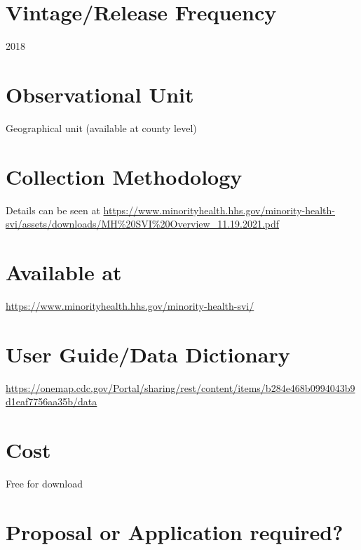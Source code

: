 \documentclass[
]{book}
\begin{document}
\hypertarget{vintagerelease-frequency-40}{%
\section{Vintage/Release Frequency}\label{vintagerelease-frequency-40}}

2018

\hypertarget{observational-unit-40}{%
\section{Observational Unit}\label{observational-unit-40}}

Geographical unit (available at county level)

\hypertarget{collection-methodology-40}{%
\section{Collection Methodology}\label{collection-methodology-40}}

Details can be seen at \url{https://www.minorityhealth.hhs.gov/minority-health-svi/assets/downloads/MH\%20SVI\%20Overview_11.19.2021.pdf}

\hypertarget{available-at-40}{%
\section{Available at}\label{available-at-40}}

\url{https://www.minorityhealth.hhs.gov/minority-health-svi/}

\hypertarget{user-guidedata-dictionary-40}{%
\section{User Guide/Data Dictionary}\label{user-guidedata-dictionary-40}}

\url{https://onemap.cdc.gov/Portal/sharing/rest/content/items/b284e468b0994043b9d1eaf7756aa35b/data}

\hypertarget{cost-40}{%
\section{Cost}\label{cost-40}}

Free for download

\hypertarget{proposal-or-application-required-40}{%
\section{Proposal or Application required?}\label{proposal-or-application-required-40}}
\end{document}
